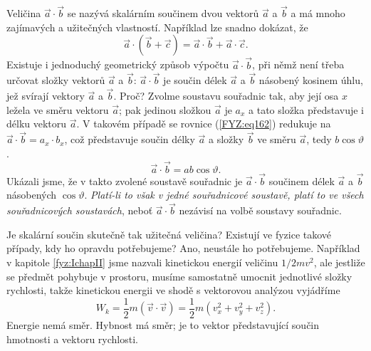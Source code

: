     Veličina \(\vec{a}\cdot\vec{b}\) se nazývá skalárním součinem dvou vektorů \(\vec{a}\) a 
    \(\vec{b}\) a má mnoho zajímavých a užitečných vlastností. Například lze snadno dokázat, že
    \begin{equation}\label{FYZ:eq164}
      \vec{a}\cdot(\vec{b} + \vec{c}) =  \vec{a}\cdot\vec{b} + \vec{a}\cdot\vec{c}.
    \end{equation}
    Existuje i jednoduchý geometrický způsob výpočtu \(\vec{a}\cdot\vec{b}\), při němž není třeba 
    určovat složky vektorů \(\vec{a}\) a \(\vec{b}\): \(\vec{a}\cdot\vec{b}\) je součin délek 
    \(\vec{a}\) a \(\vec{b}\) násobený kosinem úhlu, jež svírají vektory \(\vec{a}\) a \(\vec{b}\). 
    Proč? Zvolme soustavu souřadnic tak, aby její osa \(x\) ležela ve směru vektoru \(\vec{a}\); 
    pak jedinou složkou \(\vec{a}\) je \(a_x\) a tato složka představuje i délku vektoru 
    \(\vec{a}\). V takovém případě se rovnice (\ref{FYZ:eq162}) redukuje na \(\vec{a}\cdot\vec{b} = 
    a_x\cdot b_x\), což představuje součin délky \(\vec{a}\) a složky \(\vec{b}\) ve směru 
    \(\vec{a}\), tedy \(b\cos\vartheta\).
    \begin{equation*}
      \vec{a}\cdot\vec{b} = ab\cos\vartheta.
    \end{equation*}
    Ukázali jsme, že v takto zvolené soustavě souřadnic je \(\vec{a}\cdot\vec{b}\) součinem délek 
    \(\vec{a}\) a \(\vec{b}\) násobených \(\cos\vartheta\). \emph{Platí-li to však v jedné 
    souřadnicové soustavě, platí to ve všech souřadnicových soustavách}, neboť 
    \(\vec{a}\cdot\vec{b}\) nezávisí na volbě soustavy souřadnic.
    
    Je skalární součin skutečně tak užitečná veličina? Existují ve fyzice takové případy, kdy ho 
    opravdu potřebujeme? Ano, neustále ho potřebujeme. Například v kapitole \ref{fyz:IchapII} jsme 
    nazvali kinetickou energií veličinu \(1/2 mv^2\), ale jestliže se předmět pohybuje v prostoru, 
    musíme samostatně umocnit jednotlivé složky rychlosti, takže kinetickou energii ve shodě s 
    vektorovou analýzou vyjádříme
    \begin{equation}\label{FYZ:eq165}
      W_k = \frac{1}{2}m(\vec{v}\cdot\vec{v}) = \frac{1}{2}m(v_x^2 + v_y^2 + v_z^2).
    \end{equation}
    Energie nemá směr. Hybnost má směr; je to vektor představující součin hmotnosti a vektoru rychlosti.
    

